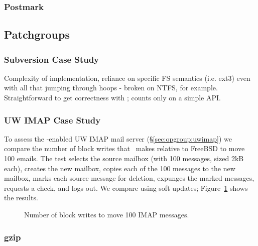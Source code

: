 \subsubsection {Postmark}

\subsection {Patchgroups}

\subsubsection {Subversion Case Study}

Complexity of implementation, reliance on specific FS semantics (i.e. ext3)
even with all that jumping through hoops - broken on NTFS, for example.
Straightforward to get correctness with \opgroups; counts only on a simple API.

\subsubsection {UW IMAP Case Study}
\label{sec:evaluation:uwimap}
To assess the \opgroup-enabled UW IMAP mail server
(\S\ref{sec:opgroup:uwimap}) we compare the number of block writes
that \Kudos\ makes relative to FreeBSD to move 100 emails. The test
selects the source mailbox (with 100 messages, sized 2kB each),
creates the new mailbox, copies each of the 100 messages to the new
mailbox, marks each source message for deletion, expunges the marked
messages, requests a check, and logs out. We compare using soft updates;
Figure~\ref{fig:imap-compare} shows the results.

\begin{figure}[htb]
\caption{\label{fig:imap-compare} Number of block writes to move 100
  IMAP messages.}
\end{figure}

\subsubsection {gzip}
